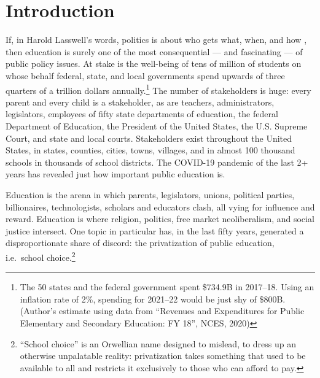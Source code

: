 
\chapter{Introduction}\label{ch:Introduction}
\bigskip%
If, in Harold Lasswell's words, politics is about who gets what, when, and how \parencite{Lasswell1936}, then education is surely one of the most consequential — and fascinating — of public policy issues. At stake is the well-being of tens of million of students on whose behalf federal, state, and local governments spend upwards of three quarters of a trillion dollars annually.\footnote{The 50 states and the federal government spent \$734.9B in 2017–18. Using an inflation rate of 2\%, spending for 2021–22 would be just shy of \$800B. (Author's estimate using data from ``Revenues and Expenditures for Public Elementary and Secondary Education: FY 18'', NCES, 2020)} The number of stakeholders is huge: every parent and every child is a stakeholder, as are teachers, administrators, legislators, employees of fifty state departments of education, the federal Department of Education, the President of the United States, the U.S. Supreme Court, and state and local courts. Stakeholders exist throughout the United States, in states, counties, cities, towns, villages, and in almost 100 thousand schools in thousands of school districts. The COVID-19 pandemic of the last 2+ years has revealed just how important public education is.

Education is the arena in which parents, legislators, unions, political parties, billionaires, technologists, scholars and educators clash, all vying for influence and reward. Education is where religion, politics, free market neoliberalism, and social justice intersect. One topic in particular has, in the last fifty years, generated a disproportionate share of discord: the privatization of public education, i.e.~school choice.\footnote{``School choice'' is an Orwellian name designed to mislead, to dress up an otherwise unpalatable reality: privatization takes something that used to be available to all and restricts it exclusively to those who can afford to pay.}

